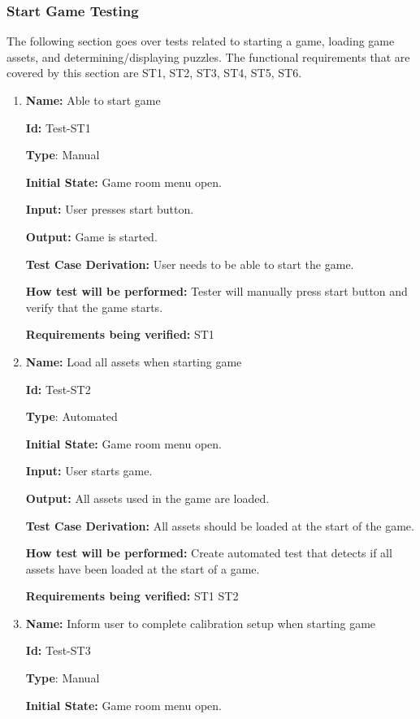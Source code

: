 \documentclass[12pt, titlepage]{article}
\begin{document}
\subsubsection{Start Game Testing}
The following section goes over tests related to starting a game, loading game assets, and determining/displaying puzzles. The functional requirements that are covered by this section are ST1, ST2, ST3, ST4, ST5, ST6.

\begin{enumerate}

\item{\textbf{Name:} Able to start game}

\textbf{Id:} Test-ST1

\textbf{Type}: Manual

\textbf{Initial State:} Game room menu open.

\textbf{Input:} User presses start button.

\textbf{Output:} Game is started.

\textbf{Test Case Derivation:} User needs to be able to start the game.

\textbf{How test will be performed:} Tester will manually press start button and verify that the game starts.

\textbf{Requirements being verified: } ST1

\item{\textbf{Name:} Load all assets when starting game}

\textbf{Id:} Test-ST2

\textbf{Type}: Automated

\textbf{Initial State:} Game room menu open.

\textbf{Input:} User starts game.

\textbf{Output:} All assets used in the game are loaded.

\textbf{Test Case Derivation:} All assets should be loaded at the start of the game.

\textbf{How test will be performed:} Create automated test that detects if all assets have been loaded at the start of a game.

\textbf{Requirements being verified: } ST1 ST2

\item{\textbf{Name:} Inform user to complete calibration setup when starting game}

\textbf{Id:} Test-ST3

\textbf{Type}: Manual

\textbf{Initial State:} Game room menu open.


\end{enumerate}
\end{document}
